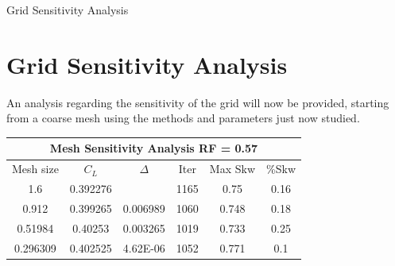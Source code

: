 \documentclass[english,10pt,a4paper,twoside]{beamer}
\begin{document}
	\begin{frame}[shrink=35]{Grid Sensitivity Analysis}
		
	\section{Grid Sensitivity Analysis}
	
	An analysis regarding the sensitivity of the grid will now be provided, starting from a coarse mesh using the methods and parameters just now studied.
	
		\begin{table}[H]
			\centering
			\begin{tabular}{|cccccc|}
				\hline
				\multicolumn{6}{|c|}{\textbf{Mesh   Sensitivity Analysis RF = 0.57}}                                                                                                                                                                                                                    \\ \hline
				\multicolumn{1}{|c|}{Mesh size}                        & \multicolumn{1}{c|}{$C_L$}                            & \multicolumn{1}{c|}{$\Delta$}                        & \multicolumn{1}{c|}{Iter}                         & \multicolumn{1}{c|}{Max Skw}                       & \%Skw \\ \hline
				\multicolumn{1}{|c|}{1.6}                              & \multicolumn{1}{c|}{0.392276}                         & \multicolumn{1}{c|}{}                                 & \multicolumn{1}{c|}{1165}                         & \multicolumn{1}{c|}{0.75}                          & 0.16  \\ \hline
				\multicolumn{1}{|c|}{0.912}                            & \multicolumn{1}{c|}{0.399265}                         & \multicolumn{1}{c|}{0.006989}                         & \multicolumn{1}{c|}{1060}                         & \multicolumn{1}{c|}{0.748}                         & 0.18  \\ \hline
				\multicolumn{1}{|c|}{0.51984}                          & \multicolumn{1}{c|}{0.40253}                          & \multicolumn{1}{c|}{0.003265}                         & \multicolumn{1}{c|}{1019}                         & \multicolumn{1}{c|}{0.733}                         & 0.25  \\ \hline
				\multicolumn{1}{|c|}{0.296309}                         & \multicolumn{1}{c|}{0.402525}                         & \multicolumn{1}{c|}{4.62E-06}                         & \multicolumn{1}{c|}{1052}                         & \multicolumn{1}{c|}{0.771}                         & 0.1   \\ \hline

\end{tabular}
\end{table}
\end{frame}
\end{document}
